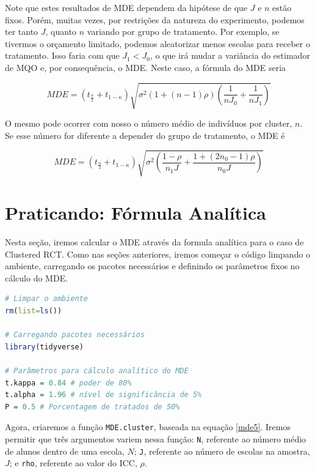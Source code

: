 Note que estes resultados de MDE dependem da hipótese de que $J$ e $n$ estão fixos. Porém, muitas vezes, por restrições da natureza do experimento, podemos ter tanto $J$, quanto $n$ variando por grupo de tratamento. Por exemplo, se tivermos o orçamento limitado, podemos aleatorizar menos escolas para receber o tratamento. Isso faria com que $J_1 < J_0$, o que irá mudar a variância do estimador de MQO e, por consequência, o MDE. Neste caso, a fórmula do MDE seria

\begin{equation}\label{mde6}
    MDE = (t_{\frac{\alpha}{2}} + t_{1-\kappa})\sqrt{\sigma^2(1 + (n-1)\rho)\left(\frac{1}{nJ_0}+\frac{1}{nJ_1}\right)}
\end{equation}

O mesmo pode ocorrer com nosso o número médio de indivíduos por cluster, $n$. Se esse número for diferente a depender do grupo de tratamento, o MDE é

\begin{equation}\label{mde7}
    MDE = (t_{\frac{\alpha}{2}} + t_{1-\kappa})\sqrt{\sigma^2\left(\frac{1-\rho}{n_1 J}+\frac{1+(2n_0 - 1)\rho}{n_0 J}\right)}
\end{equation}

\section{Praticando: Fórmula Analítica}

Nesta seção, iremos calcular o MDE através da formula analítica para o caso de Clustered RCT. Como nas seções anteriores, iremos começar o código limpando o ambiente, carregando os pacotes necessários e definindo os parâmetros fixos no cálculo do MDE.


\begin{boxH}
\begin{lstlisting}[language = R]
# Limpar o ambiente 
rm(list=ls())

# Carregando pacotes necessários
library(tidyverse)

# Parâmetros para cálculo analítico do MDE
t.kappa = 0.84 # poder de 80%
t.alpha = 1.96 # nível de significância de 5%
P = 0.5 # Porcentagem de tratados de 50%
\end{lstlisting}
\end{boxH}

Agora, criaremos a função \texttt{MDE.cluster}, baseada na equação \eqref{mde5}. Iremos permitir que três argumentos variem nessa função: \texttt{N}, referente ao número médio de alunos dentro de uma escola, $N$; \texttt{J}, referente ao número de escolas na amostra, $J$; e \texttt{rho}, referente ao valor do ICC, $\rho$.

